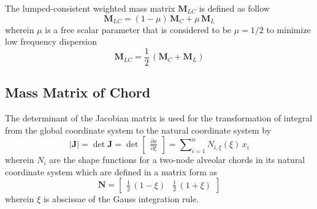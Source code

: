 The lumped-consistent weighted mass matrix $\mathbf{M}_{LC} $ is defined as follow
\begin{equation}
\mathbf{M}_{LC}  = (1 - \mu) \, \mathbf{M}_{C} + \mu \, \mathbf{M}_{L}
\end{equation}
wherein $\mu$ is a free scalar parameter that is considered to be $\mu = 1/2$ to minimize low frequency dispersion
\begin{equation}
\mathbf{M}_{LC}  = \frac{1}{2} \, (\mathbf{M}_{C} + \mathbf{M}_{L})
\label{LumconsMass}
\end{equation}

\subsection{Mass Matrix of Chord}
The determinant of the Jacobian matrix is used for the transformation of integral from the global coordinate system to the natural coordinate system by
\begin{equation}
     |\mathbf{J}| = \mathrm{\det} \mathbf{J} = \mathrm{\det} \begin{bmatrix} \frac{\partial x }{\partial\xi} \end{bmatrix} = \sum\nolimits_{i=1}^n N_{i,\xi} (\xi) \, x_i
     \label{detJac1D}
\end{equation}
wherein $N_{i}$ are the shape functions for a two-node alveolar chords in its natural coordinate system which are defined in a matrix form as
\begin{equation}
	\mathbf{N} = \begin{bmatrix}
    \frac{1}{2} \, (1 - \xi) &  \frac{1}{2} \, (1 + \xi)
\end{bmatrix} 
\end{equation}
wherein $\xi$ is abscissae of the Gauss integration rule. 

